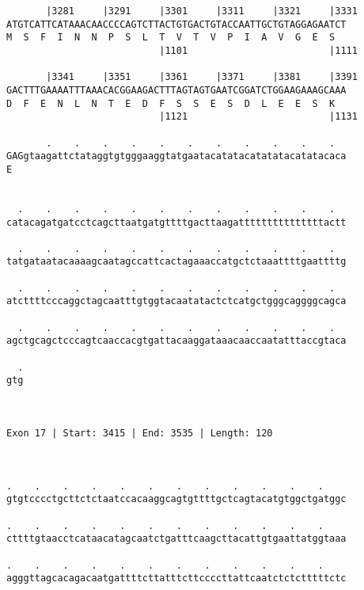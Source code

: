 \documentclass{article}
\begin{document}
\begin{Verbatim}
       |3281     |3291     |3301     |3311     |3321     |3331
ATGTCATTCATAAACAACCCCAGTCTTACTGTGACTGTACCAATTGCTGTAGGAGAATCT
M  S  F  I  N  N  P  S  L  T  V  T  V  P  I  A  V  G  E  S  
                           |1101                         |1111
  
       |3341     |3351     |3361     |3371     |3381     |3391
GACTTTGAAAATTTAAACACGGAAGACTTTAGTAGTGAATCGGATCTGGAAGAAAGCAAA
D  F  E  N  L  N  T  E  D  F  S  S  E  S  D  L  E  E  S  K  
                           |1121                         |1131
  
       .    .    .    .    .    .    .    .    .    .    .  
GAGgtaagattctataggtgtgggaaggtatgaatacatatacatatatacatatacaca
E                                                           
                                                            
  
  .    .    .    .    .    .    .    .    .    .    .    .  
catacagatgatcctcagcttaatgatgttttgacttaagatttttttttttttttactt
                                                            
  .    .    .    .    .    .    .    .    .    .    .    .  
tatgataatacaaaagcaatagccattcactagaaaccatgctctaaattttgaattttg
                                                            
  .    .    .    .    .    .    .    .    .    .    .    .  
atcttttcccaggctagcaatttgtggtacaatatactctcatgctgggcaggggcagca
                                                            
  .    .    .    .    .    .    .    .    .    .    .    .  
agctgcagctcccagtcaaccacgtgattacaaggataaacaaccaatatttaccgtaca
                                                            
  .
gtg
   
   
 
Exon 17 | Start: 3415 | End: 3535 | Length: 120



.    .    .    .    .    .    .    .    .    .    .    .    
gtgtcccctgcttctctaatccacaaggcagtgttttgctcagtacatgtggctgatggc
                                                            
.    .    .    .    .    .    .    .    .    .    .    .    
cttttgtaacctcataacatagcaatctgatttcaagcttacattgtgaattatggtaaa
                                                            
.    .    .    .    .    .    .    .    .    .    .    .    
agggttagcacagacaatgattttcttatttcttccccttattcaatctctctttttctc
                                                            

\end{Verbatim}
\end{document}
